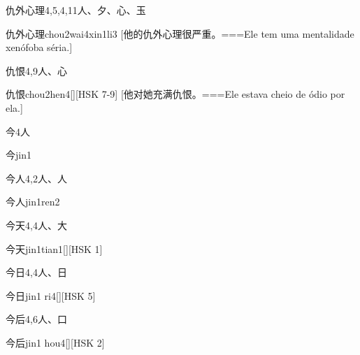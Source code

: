 \begin{Entry}{仇外心理}{4,5,4,11}{⼈、⼣、⼼、⽟}
  \begin{Phonetics}{仇外心理}{chou2wai4xin1li3}
    [他的仇外心理很严重。===Ele tem uma mentalidade xenófoba séria.]
  \end{Phonetics}
\end{Entry}

\begin{Entry}{仇恨}{4,9}{⼈、⼼}
  \begin{Phonetics}{仇恨}{chou2hen4}[][HSK 7-9]
    [他对她充满仇恨。===Ele estava cheio de ódio por ela.]
  \end{Phonetics}
\end{Entry}

\begin{Entry}{今}{4}{⼈}
  \begin{Phonetics}{今}{jin1}
  \end{Phonetics}
\end{Entry}

\begin{Entry}{今人}{4,2}{⼈、⼈}
  \begin{Phonetics}{今人}{jin1ren2}
  \end{Phonetics}
\end{Entry}

\begin{Entry}{今天}{4,4}{⼈、⼤}
  \begin{Phonetics}{今天}{jin1tian1}[][HSK 1]
  \end{Phonetics}
\end{Entry}

\begin{Entry}{今日}{4,4}{⼈、⽇}
  \begin{Phonetics}{今日}{jin1 ri4}[][HSK 5]
  \end{Phonetics}
\end{Entry}

\begin{Entry}{今后}{4,6}{⼈、⼝}
  \begin{Phonetics}{今后}{jin1 hou4}[][HSK 2]
  \end{Phonetics}
\end{Entry}


